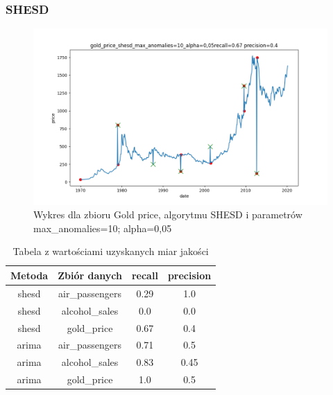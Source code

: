 \documentclass{classrep}
\begin{document}
{{            \subsubsection{SHESD} {

                \begin{figure}[!htbp]
                    \centering
                    \includegraphics[width=\textwidth]{img/gold_price_shesd_max_anomalies=10_alpha=0,05-203742.png}
                    \caption
                    {Wykres dla zbioru Gold price, algorytmu SHESD i parametrów max\_anomalies=10; alpha=0,05}
                    \label{fig:shesd_gold}
                \end{figure}
                \FloatBarrier
            }
        }

        \begin{table}[!htbp]
            \centering
            \begin{tabular}{|c|c|c|c|}
                \hline
                Metoda & Zbiór danych & recall & precision \\ \hline
                shesd & air\_passengers & 0.29 & 1.0 \\ \hline
                shesd & alcohol\_sales & 0.0 & 0.0 \\ \hline
                shesd & gold\_price & 0.67 & 0.4 \\ \hline
                arima & air\_passengers & 0.71 & 0.5 \\ \hline
                arima & alcohol\_sales & 0.83 & 0.45 \\ \hline
                arima & gold\_price & 1.0 & 0.5 \\ \hline
            \end{tabular}
            \caption{Tabela z wartościami uzyskanych miar jakości}
            \label{tab:metrics}
        \end{table}
        \FloatBarrier
    }
\end{document}
